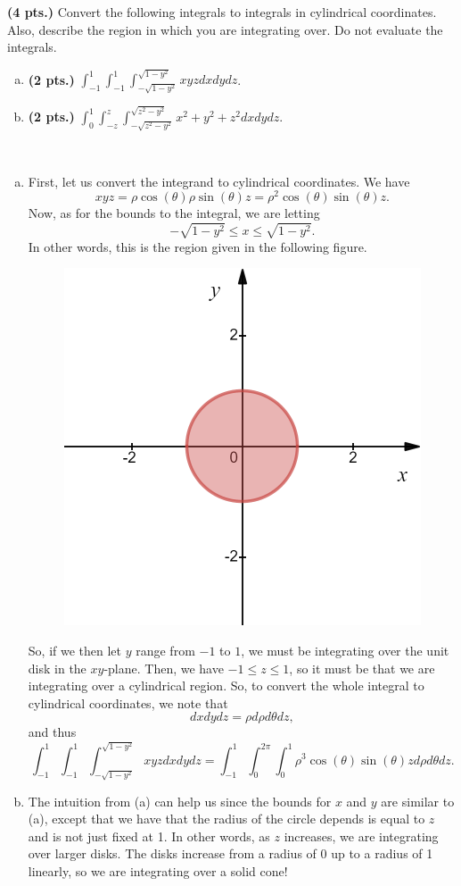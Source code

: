 \documentclass[12pt]{article} %
\begin{document}
\newpage
\begin{problem}
	\textbf{(4 pts.)} Convert the following integrals to integrals in cylindrical coordinates. Also, describe the region in which you are integrating over. Do not evaluate the integrals.
	\begin{enumerate}[(a)]
		\item \textbf{(2 pts.)} $\displaystyle{\int_{-1}^{1} \int_{-1}^{1} \int_{-\sqrt{1-y^2}}^{\sqrt{1-y^2}} xyz dxdydz}$.
		\item \textbf{(2 pts.)} $\displaystyle{\int_0^1 \int_{-z}^z \int_{-\sqrt{z^2-y^2}}^{\sqrt{z^2-y^2}} x^2+y^2+z^2 dxdydz}$.
	\end{enumerate}
\end{problem}
\begin{solution}~
\begin{enumerate}[(a)]
    \item First, let us convert the integrand to cylindrical coordinates. We have
    \[
    xyz = \rho \cos (\theta) \rho \sin(\theta) z = \rho^2 \cos(\theta)\sin(\theta)z.
    \]
    Now, as for the bounds to the integral, we are letting
    \[
    -\sqrt{1-y^2}\leq x \leq \sqrt{1-y^2}.
    \]
    In other words, this is the region given in the following figure.
    \begin{figure}[H]
        \centering    
    \includegraphics[width=.6\textwidth]{figures/disk.png}
    \end{figure} 
    So, if we then let $y$ range from $-1$ to $1$, we must be integrating over the unit disk in the $xy$-plane.  Then, we have $-1\leq z\leq 1$, so it must be that we are integrating over a cylindrical region.  So, to convert the whole integral to cylindrical coordinates, we note that
    \[
    dxdydz = \rho d\rho d\theta dz,
    \]
    and thus
    \[
    \int_{-1}^{1} \int_{-1}^{1} \int_{-\sqrt{1-y^2}}^{\sqrt{1-y^2}} xyz dxdydz = \int_{-1}^1 \int_{0}^{2\pi} \int_{0}^1 \rho^3 \cos(\theta)\sin(\theta)z d\rho d\theta dz.
    \]
    \item The intuition from (a) can help us since the bounds for $x$ and $y$ are similar to (a), except that we have that the radius of the circle depends is equal to $z$ and is not just fixed at 1. In other words, as $z$ increases, we are integrating over larger disks. The disks increase from a radius of 0 up to a radius of 1 linearly, so we are integrating over a solid cone!


\end{enumerate}
\end{solution}
\end{document}
